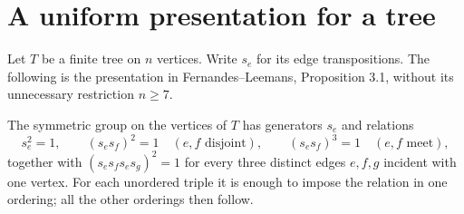 \section{A uniform presentation for a tree}
Let $T$ be a finite tree on $n$ vertices. Write $s_e$ for its edge
transpositions. The following is the presentation in Fernandes--Leemans,
Proposition 3.1, without its unnecessary restriction $n\geq7$.
\begin{theorem}\label{thm:tree}
The symmetric group on the vertices of $T$ has generators $s_e$ and
relations
\[
 s_e^2=1,\qquad (s_es_f)^2=1\quad(e,f\text{ disjoint}),\qquad
 (s_es_f)^3=1\quad(e,f\text{ meet}),
\]
together with $(s_es_fs_es_g)^2=1$ for every three distinct edges
$e,f,g$ incident with one vertex. For each unordered triple it is enough to impose the relation in one
ordering; all the other orderings then follow.
\end{theorem}
